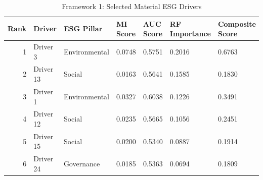 \begin{table}
\caption{Framework 1: Selected Material ESG Drivers}
\label{tab:framework1_results}
\begin{tabular}{rllllll}
\toprule
Rank & Driver & ESG Pillar & MI Score & AUC Score & RF Importance & Composite Score \\
\midrule
1 & Driver 3 & Environmental & 0.0748 & 0.5751 & 0.2016 & 0.6763 \\
2 & Driver 13 & Social & 0.0163 & 0.5641 & 0.1585 & 0.1830 \\
3 & Driver 1 & Environmental & 0.0327 & 0.6038 & 0.1226 & 0.3491 \\
4 & Driver 12 & Social & 0.0235 & 0.5665 & 0.1056 & 0.2451 \\
5 & Driver 15 & Social & 0.0200 & 0.5340 & 0.0887 & 0.1914 \\
6 & Driver 24 & Governance & 0.0185 & 0.5363 & 0.0694 & 0.1809 \\
\bottomrule
\end{tabular}
\end{table}
